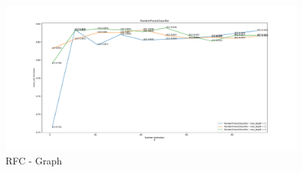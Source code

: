 \documentclass[12pt,twoside]{report}
\begin{document}
\begin{figure}[h!]
\includegraphics[width=\textwidth]{./code/figures_python/parameters/rfc_graph.pdf}
\caption{RFC - Graph}
\label{rfc:graph}
\end{figure}
\end{document}
